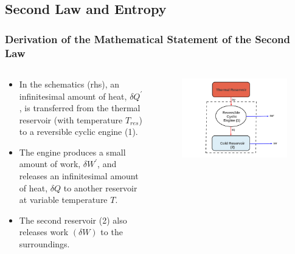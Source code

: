 \documentclass[10pt,compress]{beamer}
\begin{document}
\subsection{Second Law and Entropy}
\begin{frame}
 \frametitle{Derivation of the Mathematical Statement of the Second Law}
 \begin{columns}

  \begin{column}[c]{0.5\linewidth}
   \begin{itemize}
    \item <2-> In the schematics (rhs), an infinitesimal amount of heat, $\delta Q^{\prime}$, is transferred from the thermal reservoir (with temperature $T_{res}$) to a reversible cyclic engine (1). 
    \item <3-> The engine produces a small amount of work, $\delta W^{\prime}$, and releases an infinitesimal amount of heat, $\delta Q$ to another reservoir at variable temperature $T$. 
    \item <4-> The second reservoir (2) also releases work $\left(\delta W\right)$ to the surroundings.
   \end{itemize}


  \end{column}

  \begin{column}[c]{0.5\linewidth}
   \begin{figure}%
    \begin{center}
     \includegraphics[width=1.1\columnwidth,clip]{./Pics/2ndLaw_Schem2}
    \end{center}
   \end{figure} 
  \end{column}
 \end{columns}


 \normalsize
    
\end{frame}
\end{document}
